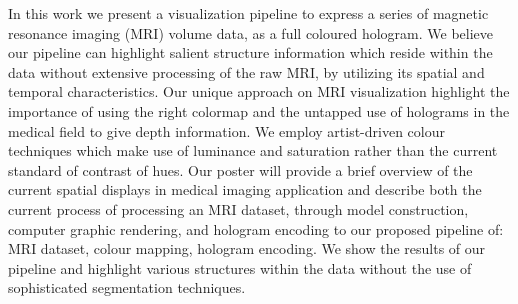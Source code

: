In this work we present a visualization pipeline to express a series of magnetic resonance imaging (MRI) volume data, as a full coloured hologram.  We believe our pipeline can highlight salient structure information which reside within the data without extensive processing of the raw MRI, by utilizing its spatial and temporal characteristics.  Our unique approach on MRI visualization highlight the importance of using the right colormap and the untapped use of holograms in the medical field to give depth information.  We employ artist-driven colour techniques which make use of luminance and saturation rather than the current standard of contrast of hues. Our poster will provide a brief overview of the current spatial displays in medical imaging application and describe both the current process of processing an MRI dataset, through model construction, computer graphic rendering, and hologram encoding to our proposed pipeline of: MRI dataset, colour mapping, hologram encoding.  We show the results of our pipeline and highlight various structures within the data without the use of sophisticated segmentation techniques.

